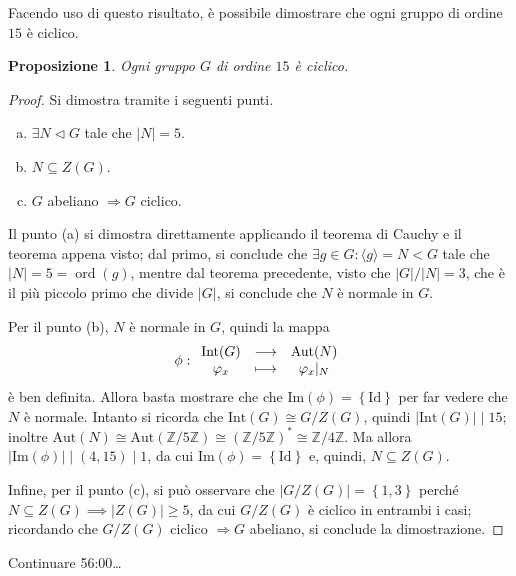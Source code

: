 \documentclass[11pt]{scrartcl}
\theoremstyle{style}
\newtheorem{prop}{Proposizione}[section]
\numberwithin{equation}{subsection}
\begin{document}
	Facendo uso di questo risultato, \`e possibile dimostrare che ogni gruppo di ordine $15$ \`e ciclico.	
\begin{prop}
	Ogni gruppo $G$ di ordine $15$ \`e ciclico.
\end{prop}
\begin{proof}
	Si dimostra tramite i seguenti punti.
	\begin{enumerate}[(a).]
		\item $\exists N \lhd G$ tale che $\lvert N \rvert  = 5$.
		\item $N \subseteq Z(G)$.
		\item $G$ abeliano $\Rightarrow  G $ ciclico.
	\end{enumerate}
	Il punto (a) si dimostra direttamente applicando il teorema di Cauchy e il teorema appena visto; dal primo, si conclude che $\exists g \in G: \langle g \rangle= N < G$ tale che $\lvert N \rvert  = 5=\operatorname{ord}(g)$, mentre dal teorema precedente, visto che $\lvert G \rvert  / \lvert N \rvert  = 3$, che \`e il pi\`u piccolo primo che divide $\lvert G \rvert $, si conclude che $N$ \`e normale in $G$.

	Per il punto (b), $N$ \`e normale in $G$, quindi la mappa 
	\[
\phi : 
		\begin{array}
			{c c c}
			\mathrm{Int} (G)& \longrightarrow &\mathrm{Aut} (N)\\
			\varphi _x &\longmapsto& \varphi _x |_{N} 
		\end{array}
	\] 
	\`e ben definita.
	Allora basta mostrare che che $\mathrm{Im} (\phi ) = \left\{ \mathrm{Id}  \right\} $ per far vedere che $N$ \`e normale.
	Intanto si ricorda che $\mathrm{Int} (G) \cong G / Z(G)$, quindi $\lvert \mathrm{Int} (G) \rvert  \mid 15$; inoltre $\mathrm{Aut} (N) \cong \mathrm{Aut} (\mathbb{Z}/5\mathbb{Z}) \cong (\mathbb{Z}/5\mathbb{Z})^* \cong \mathbb{Z}/4\mathbb{Z}$.
	Ma allora $|\mathrm{Im} (\phi )|  \mid (4,15)  \mid  1$, da cui $\mathrm{Im} (\phi ) = \left\{ \mathrm{Id}  \right\} $ e, quindi, $N \subseteq Z(G)$.

	Infine, per il punto (c), si pu\`o osservare che $\lvert G / Z(G) \rvert = \left\{ 1,3 \right\} $ perch\'e $N \subseteq Z(G) \implies \lvert Z(G) \rvert \ge 5$, da cui $G / Z(G)$ \`e ciclico in entrambi i casi; ricordando che $G / Z(G)$ ciclico $\Rightarrow  G$ abeliano, si conclude la dimostrazione.
\end{proof}
\begin{center}
	Continuare 56:00\ldots
\end{center}
\end{document}
